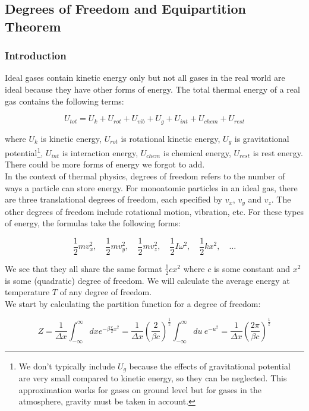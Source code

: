 \documentclass[12pt, a4paper]{article}
\begin{document}
\subsection{Degrees of Freedom and Equipartition Theorem}

\subsubsection{Introduction}

Ideal gases contain kinetic energy only but not all gases in the real world are ideal because they have other forms of energy. The total thermal energy of a real gas contains the following terms:

$$U_{tot}=U_k+U_{rot}+U_{vib}+U_g+U_{int}+U_{chem}+U_{rest}$$

where $U_k$ is kinetic energy, $U_{rot}$ is rotational kinetic energy, $U_g$ is gravitational potential\footnote{We don't typically include $U_g$ because the effects of gravitational potential are very small compared to kinetic energy, so they can be neglected. This approximation works for gases on ground level but for gases in the atmosphere, gravity must be taken in account.}, $U_{int}$ is interaction energy, $U_{chem}$ is chemical energy, $U_{rest}$ is rest energy. There could be more forms of energy we forgot to add. \\

In the context of thermal physics, degrees of freedom refers to the number of ways a particle can store energy. For monoatomic particles in an ideal gas, there are three translational degrees of freedom, each specified by $v_x$, $v_y$ and $v_z$. The other degrees of freedom include rotational motion, vibration, etc. For these types of energy, the formulas take the following forms:

$$\frac12mv_x^2, \quad \frac12mv_y^2, \quad \frac12mv_z^2, \quad \frac12I\omega^2, \quad \frac12kx^2, \quad \dots$$

We see that they all share the same format $\frac12cx^2$ where $c$ is some constant and $x^2$ is some (quadratic) degree of freedom. We will calculate the average energy at temperature $T$ of any degree of freedom. \\

We start by calculating the partition function for a degree of freedom:

$$Z=\frac{1}{\Delta x}\int_{-\infty}^\infty dx e^{-\beta\frac{c}{2}x^2}=\frac{1}{\Delta x}\left(\frac{2}{\beta c}\right)^\frac12 \int_{-\infty}^\infty du \: e^{-u^2}=\frac{1}{\Delta x}\left(\frac{2\pi}{\beta c}\right)^\frac12$$
\end{document}
